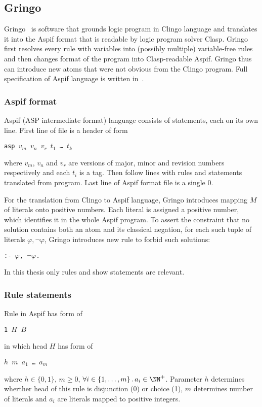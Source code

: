 \subsection{Gringo}

Gringo~\cite{GebserKKS17} is software that grounds logic program in Clingo language
and translates it into the Aspif format that is readable by logic program solver Clasp.
Gringo first resolves every rule with variables
into (possibly multiple) variable-free rules and then changes format of
the program into Clasp-readable Aspif. Gringo thus can introduce new atoms
that were not obvious from the Clingo program. Full specification of Aspif language
is written in~\cite{aspEasy2016}.

\subsubsection{Aspif format}

Aspif (ASP intermediate format) language consists of statements, each on its own
line. First line of file is a header of form 
\newcommand{\ms}{\texttt{ }}
\begin{center}
    \texttt{asp $v_m$ $v_n$ $v_r$ $t_1$ \dots{} $t_k$}
\end{center}
where $v_m$, $v_n$ and $v_r$ are versions of major, minor and revision numbers
respectively and each $t_i$ is a tag. Then follow lines with rules and statements
translated from program.
Last line of Aspif format file is a single 0.

For the translation from Clingo to Aspif language, Gringo introduces mapping $M$ of literals
onto positive numbers. Each literal is assigned a positive number, which identifies it
in the whole Aspif program. To assert the constraint that no solution contains
both an atom and its classical negation, for each such tuple of literals $\varphi, \neg\varphi$,
Gringo introduces new rule to forbid such solutions:
\begin{center}
    \texttt{:- $\varphi$, $\neg\varphi$.}
\end{center}

In this thesis only rules and show statements are relevant.

\subsubsection{Rule statements}

Rule in Aspif has form of
\begin{center}
    \texttt{1 $H$ $B$}
\end{center}
in which head $H$ has form of
\begin{center}
    \texttt{$h$ $m$ $a_1$ \dots{} $a_m$}
\end{center}
where $h\in\{0, 1\}$, $m\geq 0$,
$\forall i\in\{1, \dots, m\}\,.\, a_i\in\NN^+$. Parameter $h$ determines
wherther head of this rule is disjunction (0) or choice (1), $m$
determines number of literals and $a_i$ are literals mapped to positive integers.

